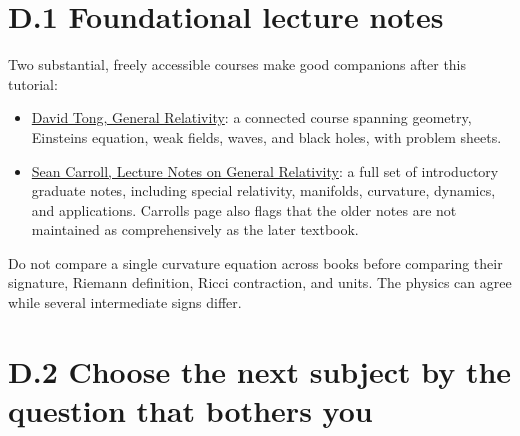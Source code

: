 \documentclass[
  11pt,
  letterpaper,
  oneside,
  openany]{scrbook}
\providecommand{\tightlist}{%
  \setlength{\itemsep}{0pt}\setlength{\parskip}{0pt}}
\begin{document}
\hypertarget{d.1-foundational-lecture-notes}{%
\section{D.1 Foundational lecture
notes}\label{d.1-foundational-lecture-notes}}

Two substantial, freely accessible courses make good companions after
this tutorial:

\begin{itemize}
\tightlist
\item
  \href{https://davidtong.org/teaching/general-relativity/}{David Tong,
  General Relativity}: a connected course spanning geometry,
  Einstein\textquotesingle s equation, weak fields, waves, and black
  holes, with problem sheets.
\item
  \href{https://preposterousuniverse.com/grnotes/}{Sean Carroll, Lecture
  Notes on General Relativity}: a full set of introductory graduate
  notes, including special relativity, manifolds, curvature, dynamics,
  and applications. Carroll\textquotesingle s page also flags that the
  older notes are not maintained as comprehensively as the later
  textbook.
\end{itemize}

Do not compare a single curvature equation across books before comparing
their signature, Riemann definition, Ricci contraction, and units. The
physics can agree while several intermediate signs differ.

\hypertarget{d.2-choose-the-next-subject-by-the-question-that-bothers-you}{%
\section{D.2 Choose the next subject by the question that bothers
you}\label{d.2-choose-the-next-subject-by-the-question-that-bothers-you}}

\begingroup\small\setlength{\tabcolsep}{5pt}\renewcommand{\arraystretch}{1.13}
\end{document}

